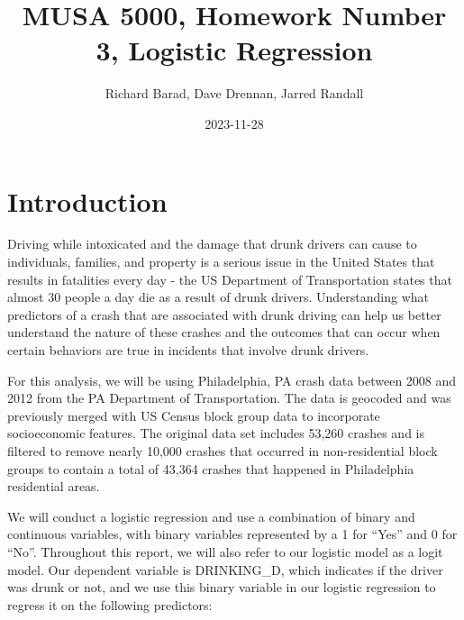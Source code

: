 \documentclass[
]{article}
\title{MUSA 5000, Homework Number 3, Logistic Regression}
\author{Richard Barad, Dave Drennan, Jarred Randall}
\date{2023-11-28}
\begin{document}
\maketitle

{
\setcounter{tocdepth}{2}
\tableofcontents
}
\hypertarget{introduction}{%
\section{Introduction}\label{introduction}}

Driving while intoxicated and the damage that drunk drivers can cause to
individuals, families, and property is a serious issue in the United
States that results in fatalities every day - the US Department of
Transportation states that almost 30 people a day die as a result of
drunk drivers. Understanding what predictors of a crash that are
associated with drunk driving can help us better understand the nature
of these crashes and the outcomes that can occur when certain behaviors
are true in incidents that involve drunk drivers.

For this analysis, we will be using Philadelphia, PA crash data between
2008 and 2012 from the PA Department of Transportation. The data is
geocoded and was previously merged with US Census block group data to
incorporate socioeconomic features. The original data set includes
53,260 crashes and is filtered to remove nearly 10,000 crashes that
occurred in non-residential block groups to contain a total of 43,364
crashes that happened in Philadelphia residential areas.

We will conduct a logistic regression and use a combination of binary
and continuous variables, with binary variables represented by a 1 for
``Yes'' and 0 for ``No''. Throughout this report, we will also refer to
our logistic model as a logit model. Our dependent variable is
DRINKING\_D, which indicates if the driver was drunk or not, and we use
this binary variable in our logistic regression to regress it on the
following predictors:
\end{document}
